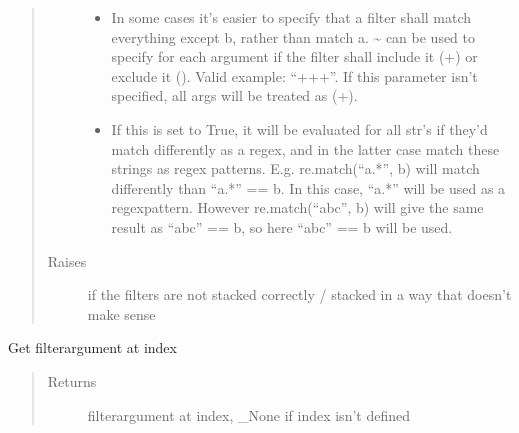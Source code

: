 \documentclass[a4paper,10pt,english]{sphinxmanual}
\begin{document}
\begin{fulllineitems}
\begin{fulllineitems}
\begin{quote}
\begin{description}
\begin{itemize}
\item {}
\sphinxAtStartPar
{} \textendash{} In some cases it’s easier to specify that a filter shall match everything except b, rather than
match a. \textasciitilde{} can be used to specify for each argument if the filter shall include it (+) or exclude it
(\sphinxhyphen{}). Valid example: “++\sphinxhyphen{}+”. If this parameter isn’t specified, all args will be treated as (+).

\item {}
\sphinxAtStartPar
{} \textendash{} If this is set to True, it will be evaluated for all str’s if they’d match differently as a
regex, and in the latter case match these strings as regex patterns. E.g. re.match(“a.*”, b) will match
differently than “a.*” == b. In this case, “a.*” will be used as a regex\sphinxhyphen{}pattern. However
re.match(“abc”, b) will give the same result as “abc” == b, so here “abc” == b will be used.

\end{itemize}

\item[{Raises}] \leavevmode
\sphinxAtStartPar
{} \textendash{} if the filters are not stacked correctly / stacked in a way that doesn’t make sense

\end{description}\end{quote}

\end{fulllineitems}


\begin{fulllineitems}
\label{\detokenize{fagus.filters:fagus.filters.KFil.__getitem__}}
\pysigstartsignatures
{}
\pysigstopsignatures
\sphinxAtStartPar
Get filter\sphinxhyphen{}argument at index
\begin{quote}\begin{description}
\item[{Returns}] \leavevmode
\sphinxAtStartPar
filter\sphinxhyphen{}argument at index, \_None if index isn’t defined

\end{description}\end{quote}


\end{fulllineitems}
\end{fulllineitems}
\end{document}

